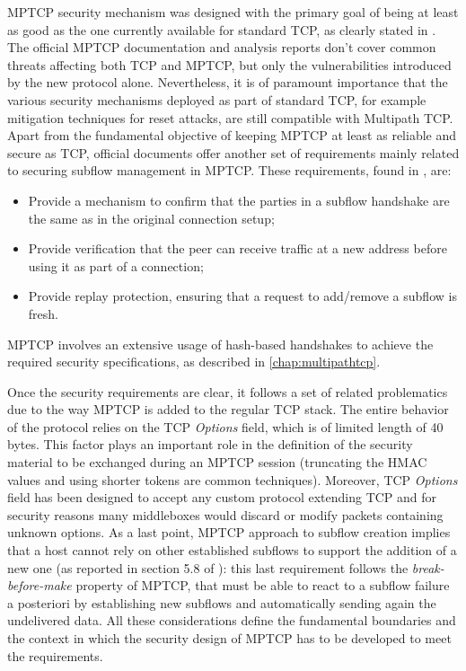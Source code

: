 MPTCP security mechanism was designed with the primary goal of being at least as good as the one currently available for standard TCP, as clearly stated in . The official MPTCP documentation and analysis reports don't cover common threats affecting both TCP and MPTCP, but only the vulnerabilities introduced by the new protocol alone. Nevertheless, it is of paramount importance that the various security mechanisms deployed as part of standard TCP, for example mitigation techniques for reset attacks, are still compatible with Multipath TCP. Apart from the fundamental objective of keeping MPTCP at least as reliable and secure as TCP, official documents offer another set of requirements mainly related to securing subflow management in MPTCP. These requirements, found in , are:
\begin{itemize} 
\item Provide a mechanism to confirm that the parties in a subflow handshake are the same as in the original connection setup;
\item Provide verification that the peer can receive traffic at a new address before using it as part of a connection;
\item Provide replay protection, ensuring that a request to add/remove a subflow is fresh.
\end{itemize}

MPTCP involves an extensive usage of hash-based handshakes to achieve the required security specifications, as described in \autoref{chap:multipathtcp}. 

Once the security requirements are clear, it follows a set of related problematics due to the way MPTCP is added to the regular TCP stack. The entire behavior of the protocol relies on the TCP \textit{Options} field, which is of limited length of 40 bytes. This factor plays an important role in the definition of the security material to be exchanged during an MPTCP session (truncating the HMAC values and using shorter tokens are common techniques). Moreover, TCP \textit{Options} field has been designed to accept any custom protocol extending TCP and for security reasons many middleboxes would discard or modify packets containing unknown options. As a last point, MPTCP approach to subflow creation implies that a host cannot rely on other established subflows to support the addition of a new one (as reported in section 5.8 of ): this last requirement follows the \textit{break-before-make} property of MPTCP, that must be able to react to a subflow failure a posteriori by establishing new subflows and automatically sending again the undelivered data. All these considerations define the fundamental boundaries and the context in which the security design of MPTCP has to be developed to meet the requirements.

